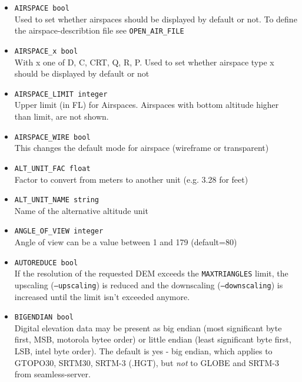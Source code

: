 \begin{itemize}

\item \texttt{AIRSPACE bool} \\
Used to set whether airspaces should be displayed by default or not. To define the airspace-describtion file see \texttt{OPEN\_AIR\_FILE}

\item \texttt{AIRSPACE\_x bool} \\
With x one of D, C, CRT, Q, R, P. Used to set whether airspace type x should be displayed by default or not

\item \texttt{AIRSPACE\_LIMIT integer} \\
Upper limit (in FL) for Airspaces. Airspaces with bottom altitude higher than limit, are not shown.

\item \texttt{AIRSPACE\_WIRE bool} \\
This changes the default mode for airspace (wireframe or transparent)

\item \texttt{ALT\_UNIT\_FAC float} \\
Factor to convert from meters to another unit (e.g. 3.28 for feet)

\item \texttt{ALT\_UNIT\_NAME string} \\
Name of the alternative altitude unit

\item \texttt{ANGLE\_OF\_VIEW integer} \\
Angle of view can be a value between 1 and 179 (default=80)

\item \texttt{AUTOREDUCE bool} \\
If the resolution of the requested DEM exceeds the \texttt{MAXTRIANGLES} limit, the upscaling (\texttt{--upscaling}) is reduced and the
downscaling (\texttt{--downscaling}) is increased until the limit isn't exceeded anymore.

\item \texttt{BIGENDIAN bool} \\
Digital elevation data may be present as big endian (most significant byte first, MSB, motorola bytee order) or little endian
(least significant byte first, LSB, intel byte order). The default is yes - big endian, which applies to GTOPO30, SRTM30, SRTM-3 (.HGT),
but \emph{not} to GLOBE and SRTM-3 from seamless-server.


\end{itemize}

